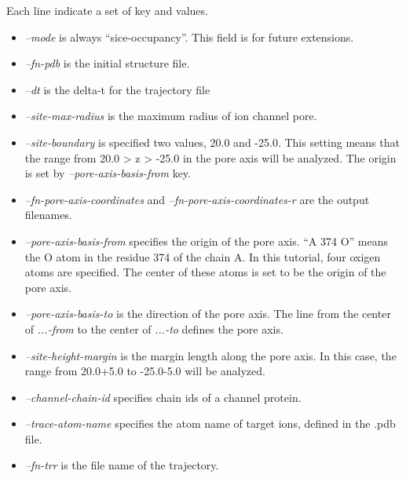\documentclass[letterpaper,10pt,english]{sphinxmanual}
\begin{document}
Each line indicate a set of key and values.
\begin{itemize}
\item {} 
\emph{--mode} is always ``sice-occupancy''. This field is for future extensions.

\item {} 
\emph{--fn-pdb} is the initial structure file.

\item {} 
\emph{--dt} is the delta-t for the trajectory file

\item {} 
\emph{--site-max-radius} is the maximum radius of ion channel pore.

\item {} 
\emph{--site-boundary} is specified two values, 20.0 and -25.0. This setting means that the range from 20.0 \textgreater{} z \textgreater{} -25.0 in the pore axis will be analyzed. The origin is set by \emph{--pore-axis-basis-from} key.

\item {} 
\emph{--fn-pore-axis-coordinates} and \emph{--fn-pore-axis-coordinates-r} are the output filenames.

\item {} 
\emph{--pore-axis-basis-from} specifies the origin of the pore axis. ``A 374 O'' means the O atom in the residue 374 of the chain A. In this tutorial, four oxigen atoms are specified. The center of these atoms is set to be the origin of the pore axis.

\item {} 
\emph{--pore-axis-basis-to} is the direction of the pore axis. The line from the center of \emph{...-from} to the center of \emph{...-to} defines the pore axis.

\item {} 
\emph{--site-height-margin} is the margin length along the pore axis. In this case, the range from 20.0+5.0 to -25.0-5.0 will be analyzed.

\item {} 
\emph{--channel-chain-id} specifies chain ids of a channel protein.

\item {} 
\emph{--trace-atom-name} specifies the atom name of target ions, defined in the .pdb file.

\item {} 
\emph{--fn-trr} is the file name of the trajectory.

\end{itemize}
\end{document}
